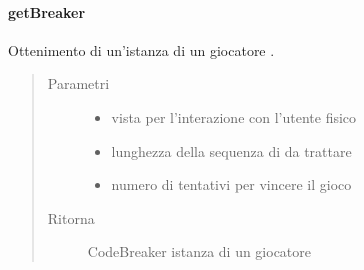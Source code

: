 \documentclass[letterpaper,10pt,italian,openany,oneside]{sphinxmanual}
\begin{document}
\paragraph{getBreaker}
\label{\detokenize{test/it/unicam/cs/pa/mastermind/factories/BreakerFactory:getbreaker}}

\begin{fulllineitems}
\label{\detokenize{test/it/unicam/cs/pa/mastermind/factories/BreakerFactory:it.unicam.cs.pa.mastermind.factories.BreakerFactory.getBreaker(GameView, int, int)}}
Ottenimento di un’istanza di un giocatore .
\begin{quote}\begin{description}
\item[{Parametri}] \leavevmode\begin{itemize}
\item {} 
 \textendash{} vista per l’interazione con l’utente fisico

\item {} 
 \textendash{} lunghezza della sequenza di  da trattare

\item {} 
 \textendash{} numero di tentativi per vincere il gioco

\end{itemize}

\item[{Ritorna}] \leavevmode
CodeBreaker istanza di un giocatore 

\end{description}\end{quote}

\end{fulllineitems}
\end{document}
